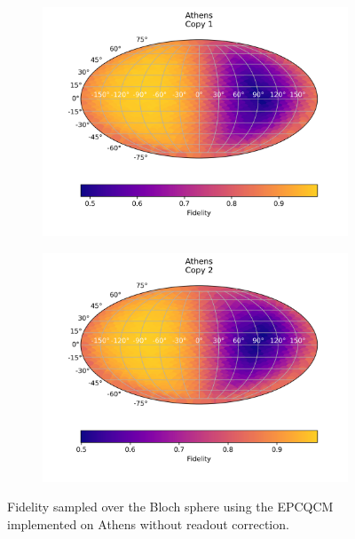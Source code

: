   \begin{figure}[H]
    \centering
    \begin{subfigure}{.5\textwidth}
      \centering
      \includegraphics[width=\textwidth]{Figures/Economical/IBM/FullSphere/results_athens_copy1.png}
      \label{fig:epc_uncorrected_athens_sphere_1}
    \end{subfigure}%
    \begin{subfigure}{.5\textwidth}
      \centering
      \includegraphics[width=\textwidth]{Figures/Economical/IBM/FullSphere/results_athens_copy2.png}
      \label{fig:epc_uncorrected_athens_sphere_2}
    \end{subfigure}
    \caption{Fidelity sampled over the Bloch sphere using the EPCQCM implemented on Athens without readout correction.}
    \label{fig:epc_uncorrected_athens_sphere}
  \end{figure}
  
